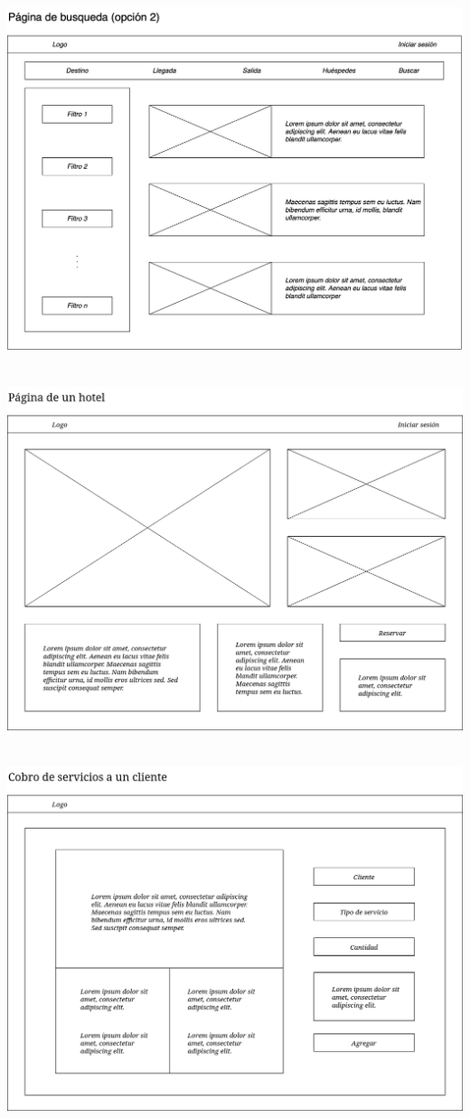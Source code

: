 \begin{center}
    \includegraphics[width=16cm, height=11cm]{img/wireframe_busqueda02.png}
    \includegraphics[width=16cm, height=11cm]{img/wireframe_pag_hotel.png}  
    \includegraphics[width=16cm, height=11cm]{img/wireframe_cobro_servicios.png}  

\end{center}
